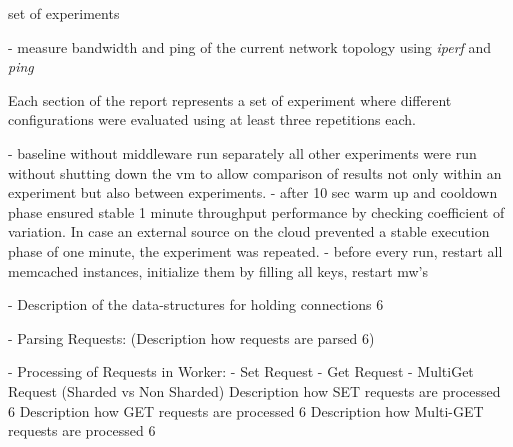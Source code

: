 \documentclass[11pt,a4paper]{article}
\begin{document}
\begin{algorithm}
	\ForEach
	{
		set of experiments
	}{
		- measure bandwidth and ping of the current network topology using \emph{iperf} and \emph{ping}
		
	}
	\caption{Each section of the report represents a set of experiment where different configurations were evaluated using at least three repetitions each.}\label{exp-suite-algo}
\end{algorithm}


- baseline without middleware run separately all other experiments were run without shutting down the vm to allow comparison of results not only within an experiment but also between experiments.
- after 10 sec warm up and cooldown phase ensured stable 1 minute throughput performance by checking coefficient of variation. In case an external source on the cloud prevented a stable execution phase of one minute, the experiment was repeated.
- before every run, restart all memcached instances, initialize them by filling all keys, restart mw's




- Description of the data-structures for holding connections 6 

- Parsing Requests: 
(Description how requests are parsed 6)

- Processing of Requests in Worker:
- Set Request
- Get Request
- MultiGet Request (Sharded vs Non Sharded)
Description how SET requests are processed 6 Description how GET requests are processed 6 Description how Multi-GET requests are processed 6 
\end{document}
